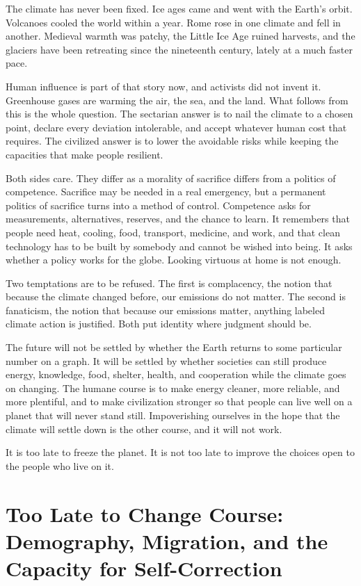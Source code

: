 \documentclass[12pt,a4paper]{book}
\begin{document}
The climate has never been fixed. Ice ages came and went with the Earth's orbit. Volcanoes cooled the world within a year. Rome rose in one climate and fell in another. Medieval warmth was patchy, the Little Ice Age ruined harvests, and the glaciers have been retreating since the nineteenth century, lately at a much faster pace.

Human influence is part of that story now, and activists did not invent it. Greenhouse gases are warming the air, the sea, and the land. What follows from this is the whole question. The sectarian answer is to nail the climate to a chosen point, declare every deviation intolerable, and accept whatever human cost that requires. The civilized answer is to lower the avoidable risks while keeping the capacities that make people resilient.

Both sides care. They differ as a morality of sacrifice differs from a politics of competence. Sacrifice may be needed in a real emergency, but a permanent politics of sacrifice turns into a method of control. Competence asks for measurements, alternatives, reserves, and the chance to learn. It remembers that people need heat, cooling, food, transport, medicine, and work, and that clean technology has to be built by somebody and cannot be wished into being. It asks whether a policy works for the globe. Looking virtuous at home is not enough.

Two temptations are to be refused. The first is complacency, the notion that because the climate changed before, our emissions do not matter. The second is fanaticism, the notion that because our emissions matter, anything labeled climate action is justified. Both put identity where judgment should be.

The future will not be settled by whether the Earth returns to some particular number on a graph. It will be settled by whether societies can still produce energy, knowledge, food, shelter, health, and cooperation while the climate goes on changing. The humane course is to make energy cleaner, more reliable, and more plentiful, and to make civilization stronger so that people can live well on a planet that will never stand still. Impoverishing ourselves in the hope that the climate will settle down is the other course, and it will not work.

It is too late to freeze the planet. It is not too late to improve the choices open to the people who live on it.


\chapter[Demography, Migration, and Self-Correction]{Too Late to Change Course: Demography, Migration, and the Capacity for Self-Correction}
\label{chap:demography}
\end{document}
